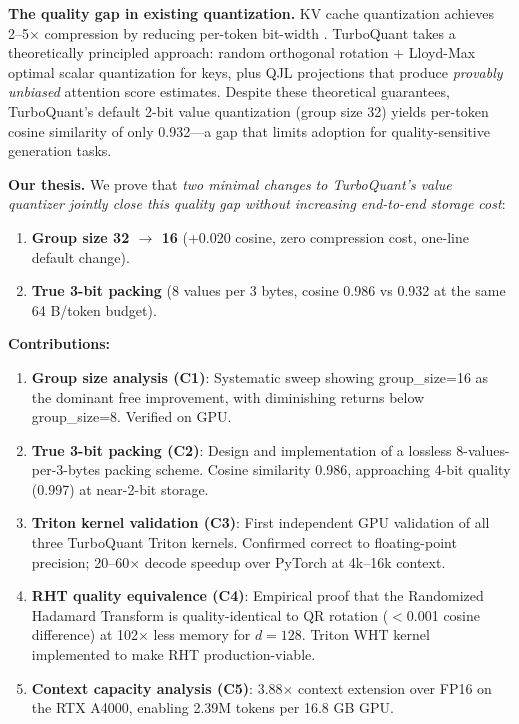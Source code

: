 \documentclass{article}
\begin{document}
\textbf{The quality gap in existing quantization.}
KV cache quantization achieves 2--5$\times$ compression by reducing per-token bit-width \citep{liu2024kivi,hooper2024kvquant}. TurboQuant \citep{turboquant2025} takes a theoretically principled approach: random orthogonal rotation + Lloyd-Max optimal scalar quantization for keys, plus QJL projections that produce \emph{provably unbiased} attention score estimates. Despite these theoretical guarantees, TurboQuant's default 2-bit value quantization (group size 32) yields per-token cosine similarity of only 0.932—a gap that limits adoption for quality-sensitive generation tasks.

\textbf{Our thesis.}
We prove that \emph{two minimal changes to TurboQuant's value quantizer jointly close this quality gap without increasing end-to-end storage cost}:
\begin{enumerate}
\item \textbf{Group size 32 $\to$ 16} (+0.020 cosine, zero compression cost, one-line default change).
\item \textbf{True 3-bit packing} (8 values per 3 bytes, cosine 0.986 vs 0.932 at the same 64 B/token budget).
\end{enumerate}

\noindent\textbf{Contributions:}
\begin{enumerate}
\item \textbf{Group size analysis (C1)}: Systematic sweep showing group\_size=16 as the dominant free improvement, with diminishing returns below group\_size=8. Verified on GPU.
\item \textbf{True 3-bit packing (C2)}: Design and implementation of a lossless 8-values-per-3-bytes packing scheme. Cosine similarity 0.986, approaching 4-bit quality (0.997) at near-2-bit storage.
\item \textbf{Triton kernel validation (C3)}: First independent GPU validation of all three TurboQuant Triton kernels. Confirmed correct to floating-point precision; 20--60$\times$ decode speedup over PyTorch at 4k--16k context.
\item \textbf{RHT quality equivalence (C4)}: Empirical proof that the Randomized Hadamard Transform is quality-identical to QR rotation ($<$0.001 cosine difference) at 102$\times$ less memory for $d=128$. Triton WHT kernel implemented to make RHT production-viable.
\item \textbf{Context capacity analysis (C5)}: 3.88$\times$ context extension over FP16 on the RTX A4000, enabling 2.39M tokens per 16.8 GB GPU.
\end{enumerate}
\end{document}
